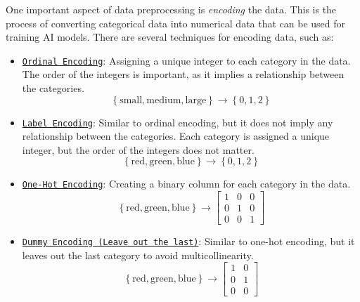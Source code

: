 One important aspect of data preprocessing is \emph{encoding} the data. This is the process of converting categorical data into numerical data that can be used for training AI models. There are several techniques for encoding data, such as:
\begin{itemize}\label{item:encoding}
    \item \ul{\texttt{Ordinal Encoding}}: Assigning a unique integer to each category in the data. The order of the integers is important, as it implies a relationship between the categories.
    \begin{equation*}
        \left\{\text{small}, \text{medium}, \text{large}\right\} \rightarrow \left\{0, 1, 2\right\}
    \end{equation*}

    \item \ul{\texttt{Label Encoding}}: Similar to ordinal encoding, but it does not imply any relationship between the categories. Each category is assigned a unique integer, but the order of the integers does not matter.
    \begin{equation*}
        \left\{\text{red}, \text{green}, \text{blue}\right\} \rightarrow \left\{0, 1, 2\right\}
    \end{equation*}
    
    \item \ul{\texttt{One-Hot Encoding}}: Creating a binary column for each category in the data.
    \begin{equation*}
        \left\{\text{red}, \text{green}, \text{blue}\right\} \rightarrow \begin{bmatrix}
            1 & 0 & 0 \\
            0 & 1 & 0 \\
            0 & 0 & 1
        \end{bmatrix}
    \end{equation*}

    \item \ul{\texttt{Dummy Encoding (Leave out the last)}}: Similar to one-hot encoding, but it leaves out the last category to avoid multicollinearity.
    \begin{equation*}
        \left\{\text{red}, \text{green}, \text{blue}\right\} \rightarrow \begin{bmatrix}
            1 & 0 \\
            0 & 1 \\
            0 & 0
        \end{bmatrix}
    \end{equation*}


\end{itemize}
